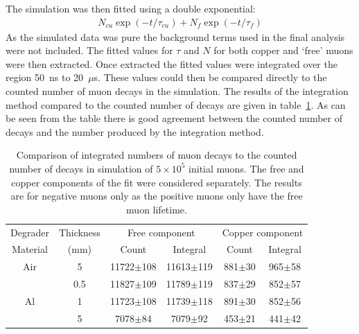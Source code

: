 The simulation was then fitted using a double exponential: 
\begin{align}
    N_{cu}\exp(-t/\tau_{cu}) + N_{f}\exp(-t/\tau_{f})
\end{align}
As the simulated data was pure the background terms used in the final analysis were not included. The fitted values for \( \tau \) and \( N \) for both copper and `free' muons were then extracted. Once extracted the fitted values were integrated over the region 50~ns to 20~\(\mu\)s. These values could then be compared directly to the counted number of muon decays in the simulation. The results of the integration method compared to the counted number of decays are given in table~\ref{tab:sim_counts_vs_integrals}. As can be seen from the table there is good agreement between the counted number of decays and the number produced by the integration method. 
 \begin{table}
  \begin{center}
  \begin{tabular}{c | c | c | c | c | c}
    Degrader  & Thickness  &  \multicolumn{2}{c|}{Free component}    &  \multicolumn{2}{c}{Copper component}      \\ 
    Material  &    (mm)    &    Count           & Integral           &    Count        &  Integral      \\ 
    \hline
    Air       &      5     &  11722\(\pm\)108   &  11613\(\pm\)119   &  881\(\pm\)30   &     965\(\pm\)58      \\ 
    \hline
    \multirow{4}{*}{Al} 
              &    0.5     &  11827\(\pm\)109   &  11789\(\pm\)119   &  837\(\pm\)29   &     852\(\pm\)57      \\ 
              &      1     &  11723\(\pm\)108   &  11739\(\pm\)118   &  891\(\pm\)30   &     852\(\pm\)56      \\ 
              &      5     &   7078\(\pm\)84    &   7079\(\pm\)92    &  453\(\pm\)21   &      441\(\pm\)42     \\ 
    
  \end{tabular}
  \end{center}
  \caption{Comparison of integrated numbers of muon decays to the counted number of decays in simulation of \(5\times10^5\) initial muons. The free and copper components of the fit were considered separately. The results are for negative muons only as the positive muons only have the free muon lifetime.}
  \label{tab:sim_counts_vs_integrals}
\end{table}


